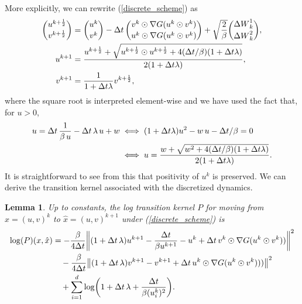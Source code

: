 \documentclass[11pt, twoside]{report}
\newtheorem{lemma}[theorem]{Lemma}
\begin{document}
More explicitly, we can rewrite (\ref{discrete_scheme}) as
\begin{align*}
    \binom{u^{k+\frac12}}{v^{k+\frac12}} &= \binom{u^k}{v^k} - {\Delta t} \,\binom{v^k \odot \nabla G(u^k\odot v^k)}{u^k \odot \nabla G(u^k\odot v^k)}  + \sqrt{\frac{2}{\beta}}
    \binom{{\Delta W}^1_k}{{\Delta W}^2_k},\\
    u^{k+1} &=  \frac{ u^{k+\frac12} + \sqrt{ u^{k+\frac12}\odot u^{k+\frac 12} + 4({\Delta t}/\beta) (1+{\Delta t}\lambda) }}{2(1+{\Delta t}\lambda)}, \\
    v^{k+1} &= \frac{1}{1+{\Delta t}\lambda} v^{k+\frac12},
\end{align*}
where the square root is interpreted element-wise and we have used the fact that, for $u>0$,
 \begin{align*}
 u = {\Delta t} \,\frac{1}{\beta\,u} - {\Delta t}\, \lambda\, u + w &\iff (1+{\Delta t} \lambda) u^2  - w\, u -{\Delta t}/\beta  = 0\\ &\iff u =\frac{ w + \sqrt{ w^2 + 4({\Delta t}/\beta) (1+{\Delta t} \lambda) }}{2(1+{\Delta t} \lambda)}.
 \end{align*}
 It is straightforward to see from this that positivity of $u^k$ is preserved. We can derive the transition kernel associated with the discretized dynamics.
 \begin{lemma}\label{lem:transition_densities}
Up to constants, the log transition kernel $P$ for  moving from $x = (u,v)^k$  to $\hat x= (u,v)^{k+1}$ under (\ref{discrete_scheme}) is
\begin{align*}
    \log(P)(x, \hat x) &= -\frac{\beta}{4\tstep} \norm{   (1+\tstep\,\lambda) u^{k+1} - \frac{\tstep}{\beta u^{k+1}} - u^k  + \tstep\, v^k\odot \nabla G(u^k\odot v^k) ) }^2\\
    &\quad -\frac{\beta}{4\tstep} \norm{   (1+\tstep\,\lambda) v^{k+1}  - v^{k+1}  + \tstep\, u^k\odot \nabla G(u^k\odot v^k)) ) }^2\\
    &\quad + \sum_{i=1}^d\log\pa{ 1+\tstep\,\lambda + \frac{\tstep}{\beta  (u^k_i)^2}}.
\end{align*}
\end{lemma}
\end{document}
